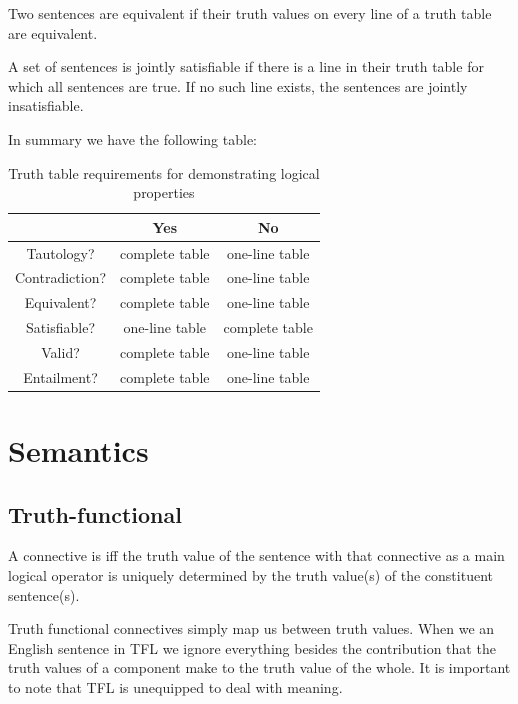 \documentclass[12pt, a4paper, oneside, openright, titlepage]{book}
\begin{document}
\begin{rmk}
    Two sentences are equivalent if their truth values on every line of a truth table are equivalent.
\end{rmk}


\begin{rmk}
    A set of sentences is jointly satisfiable if there is a line in their truth table for which all sentences are true. If no such line exists, the sentences are jointly insatisfiable.
\end{rmk}

In summary we have the following table:

\begin{table}[H]
    \centering
    \caption{Truth table requirements for demonstrating logical properties}
    \begin{tabular}{c|cc}
        & \textbf{Yes} & \textbf{No} \\ \hline
        Tautology? & complete table & one-line table \\
        Contradiction? & complete table & one-line table \\
        Equivalent? & complete table & one-line table \\
        Satisfiable? & one-line table & complete table \\
        Valid? & complete table & one-line table \\
        Entailment? & complete table & one-line table
    \end{tabular}
\end{table}



\chapter{\textsection\textsection Semantics}

\section{\textsection Truth-functional}


\begin{defn}
    A connective is  iff the truth value of the sentence with that connective as a main logical operator is uniquely determined by the truth value(s) of the constituent sentence(s).
\end{defn}

\begin{rmk}
    Truth functional connectives simply map us between truth values. When we  an English sentence in TFL we ignore everything besides the contribution that the truth values of a component make to the truth value of the whole. It is important to note that TFL is unequipped to deal with meaning.
\end{rmk}
\end{document}
